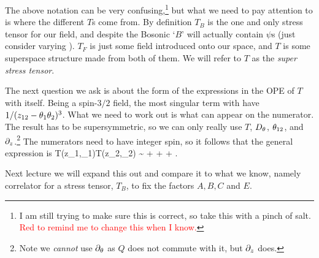 \br 
\label{rem:TBTFConfusion}
    The above notation can be very confusing,\footnote{I am still trying to make sure this is correct, so take this with a pinch of salt. \textcolor{red}{Red to remind me to change this when I know.}} but what we need to pay attention to is where the different $T$s come from. By definition $T_B$ is the one and only stress tensor for our field, and despite the Bosonic `$B$' will actually contain $\psi$s (just consider varying ). $T_F$ is just some field introduced onto our space, and $T$ is some superspace structure made from both of them. We will refer to $T$ as the \textit{super stress tensor}.
\er 

The next question we ask is about the form of the expressions in the OPE of $T$ with itself. Being a spin-$3/2$ field, the most singular term with have $1/(z_{12}-\theta_1\theta_2)^3$. What we need to work out is what can appear on the numerator. The result has to be supersymmetric, so we can only really use $T$, $D_{\theta}$, $\theta_{12}$,  and $\partial_z$.\footnote{Note we \textit{cannot} use $\partial_{\theta}$ as $Q$ does not commute with it, but $\partial_z$ does.} The numerators need to have integer spin, so it follows that the general expression is 
\bse 
    T(z_1,\th_1)T(z_2,\th_2) \sim {} +  +  + .
\ese 

Next lecture we will expand this out and compare it to what we know, namely correlator for a stress tensor, $T_B$, to fix the factors $A,B,C$ and $E$. 